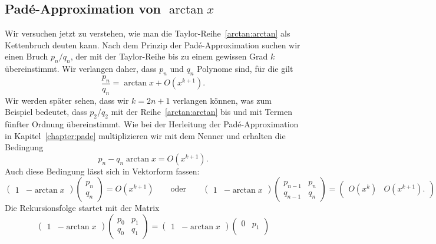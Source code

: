 \begin{refsection}
\section{Padé-Approximation von $\arctan x$
\label{arctan:section:kettenbruch}}
Wir versuchen jetzt zu verstehen, wie man die Taylor-Reihe~\ref{arctan:arctan}
als Kettenbruch deuten kann.
Nach dem Prinzip der Padé-Approximation suchen wir einen Bruch $p_n/q_n$,
der mit der Taylor-Reihe bis zu einem gewissen Grad $k$ übereinstimmt.
Wir verlangen daher, dass $p_n$ und $q_n$ Polynome sind, für die gilt
\[
\frac{p_n}{q_n} = \arctan x + O(x^{k+1}).
\]
Wir werden später sehen, dass wir $k=2n+1$ verlangen können, was zum
Beispiel bedeutet, dass $p_2/q_2$ mit der Reihe~\ref{arctan:arctan}
bis und mit Termen fünfter Ordnung übereinstimmt.
Wie bei der Herleitung der Padé-Approximation in Kapitel~\ref{chapter:pade}
multiplizieren wir mit dem Nenner und erhalten die Bedingung
\begin{equation}
p_n - q_n\arctan x = O(x^{k+1}).
\label{arctan:bedingung}
\end{equation}
Auch diese Bedingung lässt sich in Vektorform fassen:
\begin{equation}
\begin{pmatrix}
1&-\arctan x
\end{pmatrix}
\begin{pmatrix} 
p_n\\q_n
\end{pmatrix}
=
O(x^{k+1})
\qquad\text{oder}\qquad
\begin{pmatrix}
1&-\arctan x
\end{pmatrix}
\begin{pmatrix}
p_{n-1}&p_n\\
q_{n-1}&q_n
\end{pmatrix}
=
\begin{pmatrix}
O(x^{k})&O(x^{k+1}).
\end{pmatrix}
\label{arctan:bedingungmatrix}
\end{equation}
Die Rekursionsfolge startet mit der Matrix
\[
\begin{pmatrix}
1&-\arctan x
\end{pmatrix}
\begin{pmatrix}
p_0&p_1\\
q_0&q_1
\end{pmatrix}
=
\begin{pmatrix}
1&-\arctan x
\end{pmatrix}
\begin{pmatrix}
0&p_1\\

\end{pmatrix}\]
\end{refsection}
